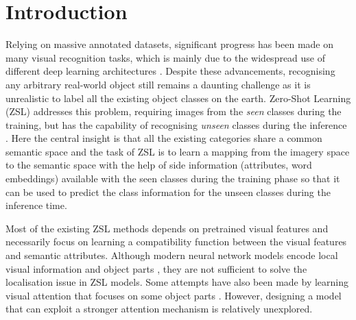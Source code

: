 \documentclass[a4paper,11pt]{article}
\begin{document}
\section{Introduction}
Relying on massive annotated datasets, significant progress has been made on many visual recognition tasks, which is mainly due to the widespread use of different deep learning architectures \cite{Ren2015FasterRT, ViT, khan2021transformers}. Despite these advancements, recognising any arbitrary real-world object still remains a daunting challenge as it is unrealistic to label all the existing object classes on the earth. Zero-Shot Learning (ZSL) addresses this problem, requiring images from the \emph{seen} classes during the training, but has the capability of recognising \emph{unseen} classes during the inference \cite{8413121, AREN, APN, Fedirici2020MIB}. Here the central insight is that all the existing categories share a common semantic space and the task of ZSL is to learn a mapping from the imagery space to the semantic space with the help of side information (attributes, word embeddings) \cite{AWA2:journals/corr/XianSA17,Mikolov2013DistributedRO, Pennington2014GloveGV} available with the seen classes during the training phase so that it can be used to predict the class information for the unseen classes during the inference time.

Most of the existing ZSL methods \cite{8578679, Schnfeld2019GeneralizedZA} depends on pretrained visual features and necessarily focus on learning a compatibility function between the visual features and semantic attributes. Although modern neural network models encode local visual information and object parts \cite{AREN}, they are not sufficient to solve the localisation issue in ZSL models. Some attempts have also been made by learning visual attention that focuses on some object parts \cite{SGMA}. However, designing a model that can exploit a stronger attention mechanism is relatively unexplored.

\end{document}

